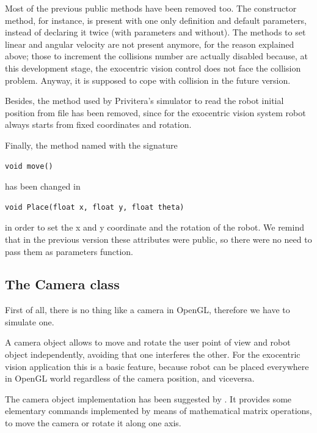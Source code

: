 %
Most of the previous public methods have been removed too. 
The constructor method, for instance, is present with one
only definition and default parameters, instead of declaring 
it twice (with parameters and without). The methods to set
linear and angular velocity are not present anymore, for 
the reason explained above; those to increment the collisions 
number are actually disabled because, at this development 
stage, the exocentric vision control does not face the collision 
problem. Anyway, it is supposed to cope with collision in 
the future version.
%

%
Besides, the method used by Privitera's simulator to read 
the robot initial position from file has been removed, since 
for the exocentric vision system robot always starts from 
fixed coordinates and rotation.
%

%
Finally, the method named with the signature 
\begin{verbatim} 
void move() 
\end{verbatim} 
has been changed in 
\begin{verbatim} 
void Place(float x, float y, float theta)
\end{verbatim}
in order to set the x and y coordinate and the rotation of the robot. 
We remind that in the previous version these attributes
were public, so there were no need to pass them as parameters function.

\subsection{The Camera class}
First of all, there is no thing like a camera in OpenGL, therefore we have to
simulate one.
%

%
A camera object allows to move and rotate the user point of view and robot
object independently, avoiding that one interferes the other. For the exocentric
vision application this is a basic feature, because robot can be placed
everywhere in OpenGL world regardless of the camera position, and viceversa.
%

%
The camera object implementation has been suggested by \cite{opengl:camera}.
It provides some elementary commands implemented by means of mathematical matrix
operations, to move the camera or rotate it along one axis.

